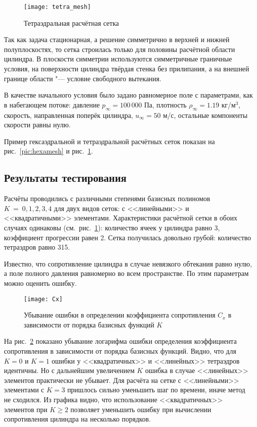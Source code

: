 \begin{figure}[h]
	\centering
	\texttt{[image: tetra\_mesh]}
	\caption{Тетраэдральная расчётная сетка}
	\label{pic:tetramesh}
\end{figure}

Так как задача стационарная, а решение симметрично в верхней и нижней полуплоскостях, то сетка строилась только для половины расчётной области цилиндра. В плоскости симметрии используются симметричные граничные условия, на поверхности цилиндра твёрдая стенка без прилипания, а на внешней границе области "--- условие свободного вытекания.

В качестве начального условия было задано равномерное поле с параметрами, как в набегающем потоке: давление \(p_\infty = 100\,000\) Па, плотность \(\rho_\infty = 1.19\) кг/\(\text{м}^3\), скорость, направленная поперёк цилиндра, \(u_\infty = 50\) м/с, остальные компоненты скорости равны нулю.

Пример гексаэдральной и тетраэдральной расчётных сеток показан на рис.~\ref{pic:hexamesh} и рис.~\ref{pic:tetramesh}.



\subsection{Результаты тестирования}

Расчёты проводились с различными степенями базисных полиномов \(K~=~0, 1, 2, 3, 4\) для двух видов сеток: с <<линейными>> и <<квадратичными>> элементами. Характеристики расчётной сетки в обоих случаях одинаковы (см.~рис.~\ref{pic:tetramesh}): количество ячеек у цилиндра равно 3, коэффициент прогрессии равен 2. Сетка получилась довольно грубой: количество тетраэдров равно 315.

Известно, что сопротивление цилиндра в случае невязкого обтекания равно нулю, а поле полного давления равномерно во всем пространстве. По этим параметрам можно оценить ошибку.

\begin{figure}[ht]
	\centering
	\texttt{[image: Cx]}
	\caption{Убывание ошибки в определении коэффициента сопротивления \(C_{x}\) в зависимости от порядка базисных функций \(K\)}
	\label{pic:Cx}
\end{figure}

На рис.~\ref{pic:Cx} показано убывание логарифма ошибки определения коэффициента сопротивления в зависимости от порядка базисных функций. Видно, что для \(K = 0\) и \(K = 1\) ошибки у <<квадратичных>> и <<линейных>> тетраэдров идентичны. Но с дальнейшим увеличением \(K\) ошибка в случае <<линейных>> элементов практически не убывает. Для расчёта на сетке с <<линейными>> элементами с \(K = 3\) пришлось сильно уменьшить шаг по времени, иначе метод не сходился. Из графика видно, что использование <<квадратичных>> элементов при \(K \geq 2\) позволяет уменьшить ошибку при вычислении сопротивления цилиндра на несколько порядков.

